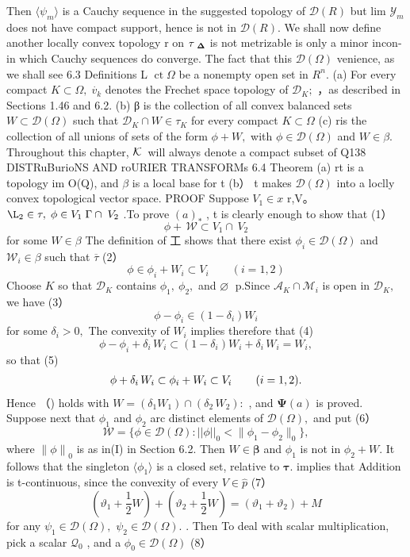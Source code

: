 Then $\langle\psi_{m}\rangle$ is a Cauchy sequence in the suggested topology of ${\mathcal{D}}(R)$ but lim ${\mathcal{Y}}_{m}$ does not have compact support, hence is not in ${\mathcal{D}}(R).$ We shall now define another locally convex topology r on $\tau_{\mathrm{\bf~\Delta}}$ is not metrizable is only a minor incon- in which Cauchy sequences do converge. The fact that this ${\mathcal{D}}(\Omega)$ venience, as we shall see 6.3 Definitions L $\operatorname{ct}\Omega$ be a nonempty open set in $\textstyle R^{n}.$ (a) For every compact $K\subset\Omega,\;{\dot{v_{k}}}$ denotes the Frechet space topology of ${\mathcal{D}}_{K};$ ，as described in Sections 1.46 and 6.2. (b) β is the collection of all convex balanced sets $W\subset{\mathcal{D}}(\Omega)$ such that ${\mathcal{D}}_{K}\cap W\in\tau_{K}$ for every compact $K\subset\Omega$ (c) ris the collection of all unions of sets of the form $\phi+W,$ with $\phi\in{\mathcal{D}}(\Omega)$ and $W\in\beta.$ Throughout this chapter, ${\cal K}\,$ will always denote a compact subset of Q138 DISTRuBurioNS AND roURIER TRANSFORMs 6.4 Theorem (a) rt is a topology im O(Q), and $\beta$ is a local base for t (b） t makes ${\mathcal{D}}(\Omega)$ into a loclly convex topological vector space. PROOF Suppose $V_{1}\in x$ r,V。 $\L_{2}\in\tau,\;\phi\in V_{1}\;\Gamma\cap\;V_{2}$ .To prove $(a)_{*}$ , t is clearly enough to show that (1） $$ \phi+\,\mathcal{W}\subset V_{1}\cap\,V_{2} $$ for some $\textstyle W\in{\beta}$ The definition of 工 shows that there exist $\phi_{i}\in{\mathcal{D}}(\Omega)$ and $\mathcal{W}_{i}\in\beta$ such that $\overline{{\tau}}$ (2） $$ \phi\in\phi_{i}+W_{i}\subset V_{i}\qquad(i=1,2) $$ Choose $\textstyle K$ so that ${\mathcal{D}}_{K}$ contains $\phi_{1},\ \phi_{2},$ and $\varnothing\;$ p.Since $\mathcal{A}_{K}\cap\mathcal{M}_{i}$ is open in ${\mathcal{D}}_{K},$ we have (3） $$ \phi-\phi_{i}\in(1-\delta_{i})W_{i} $$ for some $\delta_{i}>0,$ The convexity of $W_{i}$ implies therefore that (4) $$ \phi-\phi_{i}+\delta_{i}\,W_{i}\subset(1-\delta_{i})W_{i}+\delta_{i}\,W_{i}=W_{i}, $$ so that (5) $$ \begin{array}{c c c}{{\phi+\delta_{i}\,W_{i}\subset\phi_{i}+W_{i}\subset V_{i}\,\qquad(i=1,2).}}\end{array} $$ Hence （) holds with $W=(\delta_{1}W_{1})\cap(\delta_{2}\,W_{2})\colon$ , and $\mathbf{\Psi}(a)$ is proved. Suppose next that $\phi_{1}$ and $\phi_{2}$ arc distinct elements of ${\mathcal{D}}(\Omega),$ and put (6） $$ {\mathcal W}=\{\phi\in\mathcal{D}(\Omega)\colon||\phi||_{0}<\|\phi_{1}-\phi_{2}\|_{0}\}, $$ where $\left\|\phi\right\|_{0}$ is as in(I) in Section 6.2. Then $W\in{\boldsymbol{\beta}}$ and $\phi_{1}$ is not in $\phi_{2}+W.$ It follows that the singleton $\langle\phi_{1}\rangle$ is a closed set, relative to ${\boldsymbol{\tau}}.$ implies that Addition is t-continuous, since the convexity of every $\scriptstyle V\in{\hat{p}}$ (7） $$ (\vartheta_{1}+{\textstyle\frac{1}{2}}W)+(\vartheta_{2}+{\textstyle\frac{1}{2}}W)=(\vartheta_{1}+\vartheta_{2})+M $$ for any $\psi_{1}\in{\mathcal{D}}(\Omega),$ $\psi_{2}\in{\mathcal{D}}(\Omega).$ . Then To deal with scalar multiplication, pick a scalar ${\mathcal{Q}}_{0}$ , and a $\phi_{0}\in{\mathcal{D}}(\Omega)$ (8） $$ 